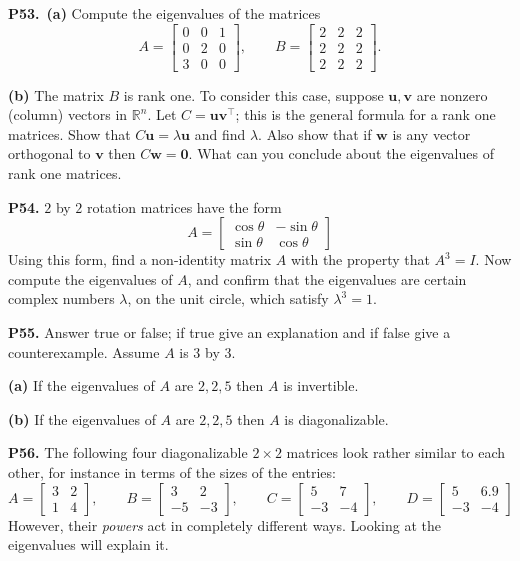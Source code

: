\documentclass[12pt]{amsart}
\newcommand{\bu}{\bm{u}}
\newcommand{\bv}{\bm{v}}
\newcommand{\bw}{\bm{w}}
\newcommand{\bzero}{\bm{0}}
\newcommand{\RR}{\mathbb{R}}
\newcommand{\prob}[1]{\bigskip\noindent\textbf{#1.}\quad }
\newcommand{\epart}[1]{\medskip\noindent\textbf{(#1)}\quad }
\newcommand{\ppart}[1]{\,\textbf{(#1)}\quad }
\begin{document}
\prob{P53}  \ppart{a}  Compute the eigenvalues of the matrices
    $$A = \begin{bmatrix} 0 & 0 & 1 \\ 0 & 2 & 0 \\ 3 & 0 & 0 \end{bmatrix}, \qquad B = \begin{bmatrix} 2 & 2 & 2 \\ 2 & 2 & 2 \\ 2 & 2 & 2 \end{bmatrix}.$$

\epart{b}  The matrix $B$ is rank one.  To consider this case, suppose $\bu,\bv$ are nonzero (column) vectors in $\RR^n$.  Let $C = \bu \bv^\top$; this is the general formula for a rank one matrices.  Show that $C \bu = \lambda \bu$ and find $\lambda$.  Also show that if $\bw$ is any vector orthogonal to $\bv$ then $C \bw = \bzero$.  What can you conclude about the eigenvalues of rank one matrices.


\prob{P54}  $2$ by $2$ rotation matrices have the form
    $$A = \begin{bmatrix} \cos \theta & - \sin \theta \\ \sin \theta & \cos \theta \end{bmatrix}$$
Using this form, find a non-identity matrix $A$ with the property that $A^3=I$.  Now compute the eigenvalues of $A$, and confirm that the eigenvalues are certain complex numbers $\lambda$, on the unit circle, which satisfy $\lambda^3=1$.


\prob{P55}  Answer true or false; if true give an explanation and if false give a counterexample.  Assume $A$ is $3$ by $3$.

\epart{a}  If the eigenvalues of $A$ are $2,2,5$ then $A$ is invertible.

\epart{b}  If the eigenvalues of $A$ are $2,2,5$ then $A$ is diagonalizable.


\prob{P56}  The following four diagonalizable $2\times 2$ matrices look rather similar to each other, for instance in terms of the sizes of the entries:
    $$A = \begin{bmatrix} 3 & 2 \\ 1 & 4 \end{bmatrix}, \qquad B = \begin{bmatrix} 3 & 2 \\ -5 & -3 \end{bmatrix}, \qquad C = \begin{bmatrix} 5 & 7 \\ -3 & -4 \end{bmatrix}, \qquad D = \begin{bmatrix} 5 & 6.9 \\ -3 & -4 \end{bmatrix}$$
However, their \emph{powers} act in completely different ways.  Looking at the eigenvalues will explain it.
\end{document}
